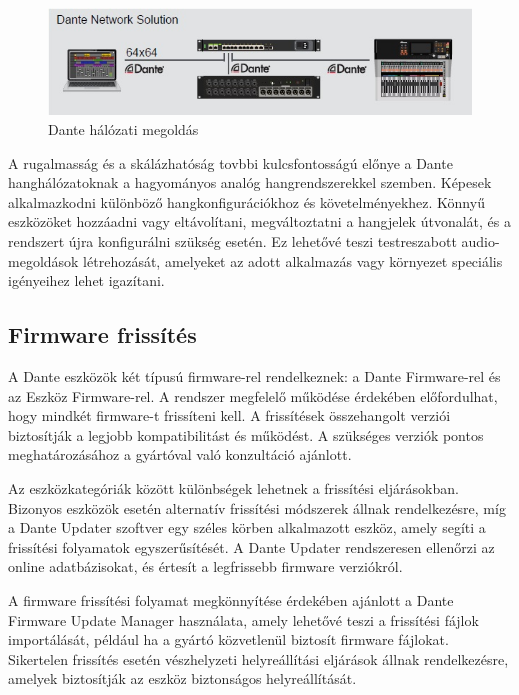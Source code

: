 \begin{figure}[H]
	\centering
	\includegraphics[width=\linewidth, keepaspectratio]{figures/dante-solution.jpg}
	\caption{Dante hálózati megoldás}
	\label {fig:dante-solution}
\end{figure}
A rugalmasság és a skálázhatóság tovbbi kulcsfontosságú előnye a Dante
hanghálózatoknak a hagyományos analóg hangrendszerekkel szemben.
Képesek alkalmazkodni különböző hangkonfigurációkhoz és követelményekhez. 
Könnyű eszközöket hozzáadni vagy eltávolítani, megváltoztatni a hangjelek útvonalát, és a rendszert újra
konfigurálni szükség esetén. Ez lehetővé teszi testreszabott audio-megoldások
létrehozását, amelyeket az adott alkalmazás vagy környezet speciális igényeihez
lehet igazítani. 
\subsection{Firmware frissítés}
A Dante eszközök két típusú firmware-rel rendelkeznek: a Dante Firmware-rel és az 
Eszköz Firmware-rel. A rendszer megfelelő működése érdekében előfordulhat, hogy mindkét 
firmware-t frissíteni kell. A frissítések összehangolt verziói biztosítják a legjobb 
kompatibilitást és működést. A szükséges verziók pontos meghatározásához a gyártóval 
való konzultáció ajánlott.

Az eszközkategóriák között különbségek lehetnek a frissítési eljárásokban. Bizonyos 
eszközök esetén alternatív frissítési módszerek állnak rendelkezésre, míg a Dante 
Updater szoftver egy széles körben alkalmazott eszköz, amely segíti a frissítési 
folyamatok egyszerűsítését. A Dante Updater rendszeresen ellenőrzi az online 
adatbázisokat, és értesít a legfrissebb firmware verziókról.

A firmware frissítési folyamat megkönnyítése érdekében ajánlott a Dante Firmware 
Update Manager használata, amely lehetővé teszi a frissítési fájlok importálását, 
például ha a gyártó közvetlenül biztosít firmware fájlokat. Sikertelen frissítés 
esetén vészhelyzeti helyreállítási eljárások állnak rendelkezésre, amelyek biztosítják 
az eszköz biztonságos helyreállítását.

